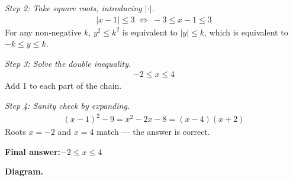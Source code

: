 \documentclass[11pt]{article}
\begin{document}
\textit{Step 2: Take square roots, introducing \( | \cdot | \).}
\[\begin{gathered}
|x - 1| \leq 3 \;\Longleftrightarrow\; -3 \leq x - 1 \leq 3
\end{gathered}\]
For any non-negative \( k \), \( y^2 \leq k^2 \) is equivalent to \( |y| \leq k \), which is equivalent to \( -k \leq y \leq k \).

\textit{Step 3: Solve the double inequality.}
\[\begin{gathered}
-2 \leq x \leq 4
\end{gathered}\]
Add 1 to each part of the chain.

\textit{Step 4: Sanity check by expanding.}
\[\begin{gathered}
(x - 1)^2 - 9 = x^2 - 2x - 8 = (x - 4)(x + 2)
\end{gathered}\]
Roots \( x = -2 \) and \( x = 4 \) match --- the answer is correct.

\begin{answerbox}
\textbf{Final answer:}\quad \(\displaystyle -2 \leq x \leq 4\)
\end{answerbox}
\textbf{Diagram.}
\end{document}
